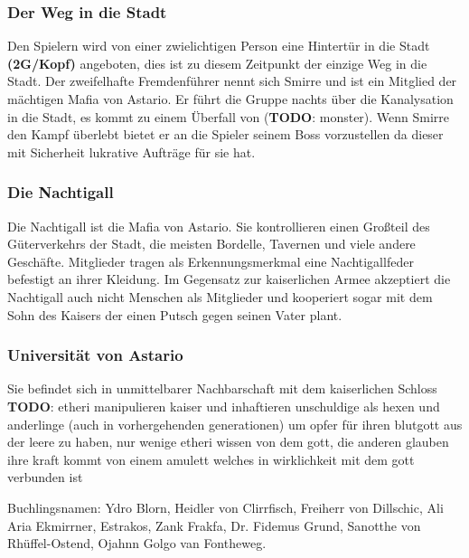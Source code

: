 \documentclass[11pt, twoside]{article}
\begin{document}
\subsubsection{Der Weg in die Stadt}
\label{sec:org3d05704}
Den Spielern wird von einer zwielichtigen Person eine Hintertür in die Stadt \textbf{(2G/Kopf)} angeboten, dies ist zu diesem Zeitpunkt der einzige Weg in die Stadt.
Der zweifelhafte Fremdenführer nennt sich Smirre und ist ein Mitglied der mächtigen Mafia von Astario. Er führt die Gruppe nachts über die Kanalysation in die Stadt, es kommt zu einem Überfall von (\textbf{TODO}: monster). Wenn Smirre den Kampf überlebt bietet er an die Spieler seinem Boss vorzustellen da dieser mit Sicherheit lukrative Aufträge für sie hat.
\subsubsection{Die Nachtigall}
\label{sec:org2704329}
Die Nachtigall ist die Mafia von Astario. Sie kontrollieren einen Großteil des Güterverkehrs der Stadt, die meisten Bordelle, Tavernen und viele andere Geschäfte.
Mitglieder tragen als Erkennungsmerkmal eine Nachtigallfeder befestigt an ihrer Kleidung.
Im Gegensatz zur kaiserlichen Armee akzeptiert die Nachtigall auch nicht Menschen als Mitglieder und kooperiert sogar mit dem Sohn des Kaisers der einen Putsch gegen seinen Vater plant.
\subsubsection{Universität von Astario}
\label{sec:orgf018a71}
Sie befindet sich in unmittelbarer Nachbarschaft mit dem kaiserlichen Schloss
\textbf{TODO}: etheri manipulieren kaiser und inhaftieren unschuldige als hexen und anderlinge (auch in vorhergehenden generationen) um opfer für ihren blutgott aus der leere zu haben, nur wenige etheri wissen von dem gott, die anderen glauben ihre kraft kommt von einem amulett welches in wirklichkeit mit dem gott verbunden ist

Buchlingsnamen: Ydro Blorn, Heidler von Clirrfisch, Freiherr von Dillschic, Ali Aria Ekmirrner, Estrakos, Zank Frakfa, Dr. Fidemus Grund, Sanotthe von Rhüffel-Ostend, Ojahnn Golgo van Fontheweg.
\end{document}
